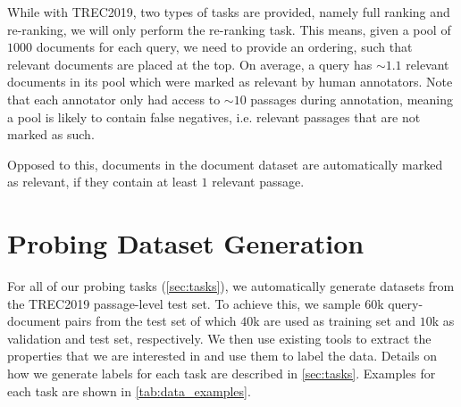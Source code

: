 While with TREC2019, two types of tasks are provided, namely full ranking and re-ranking, we will only perform the re-ranking task. This means, given a pool of $1000$ documents for each query, we need to provide an ordering, such that relevant documents are placed at the top. On average, a query has $\sim 1.1$ relevant documents in its pool which were marked as relevant by human annotators. Note that each annotator only had access to $\sim 10$ passages during annotation, meaning a pool is likely to contain false negatives, i.e. relevant passages that are not marked as such.

Opposed to this, documents in the document dataset are automatically marked as relevant, if they contain at least $1$ relevant passage.

\section{Probing Dataset Generation}
\label{sec:dataset_gen}
For all of our probing tasks (\autoref{sec:tasks}), we automatically generate datasets from the TREC2019 passage-level test set. To achieve this, we sample $60$k query-document pairs from the test set of which $40$k are used as training set and $10$k as validation and test set, respectively. We then use existing tools to extract the properties that we are interested in and use them to label the data. Details on how we generate labels for each task are described in \autoref{sec:tasks}. Examples for each task are shown in \autoref{tab:data_examples}.

